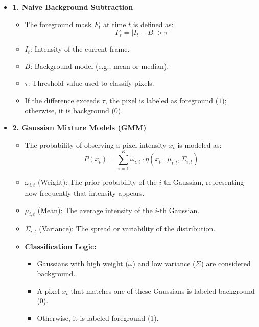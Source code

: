 \documentclass[12pt]{article}
\begin{document}
\begin{itemize}
    \item \textbf{1. Naive Background Subtraction}

          \begin{itemize}
              \item The foreground mask $F_t$ at time $t$ is defined as:
                    \[
                        F_t = |I_t - B| > \tau
                    \]

              \item $I_t$: Intensity of the current frame.

              \item $B$: Background model (e.g., mean or median).

              \item $\tau$: Threshold value used to classify pixels.

              \item If the difference exceeds $\tau$, the pixel is labeled as foreground ($1$); otherwise, it is background ($0$).
          \end{itemize}

    \item \textbf{2. Gaussian Mixture Models (GMM)}

          \begin{itemize}
              \item The probability of observing a pixel intensity $x_t$ is modeled as:
                    \[
                        P(x_t) = \sum_{i=1}^{K} \omega_{i,t} \cdot \eta(x_t \mid \mu_{i,t}, \Sigma_{i,t})
                    \]

              \item $\omega_{i,t}$ (Weight): The prior probability of the $i$-th Gaussian, representing how frequently that intensity appears.

              \item $\mu_{i,t}$ (Mean): The average intensity of the $i$-th Gaussian.

              \item $\Sigma_{i,t}$ (Variance): The spread or variability of the distribution.

              \item \textbf{Classification Logic:}
                    \begin{itemize}
                        \item Gaussians with high weight ($\omega$) and low variance ($\Sigma$) are considered background.
                        \item A pixel $x_t$ that matches one of these Gaussians is labeled background ($0$).
                        \item Otherwise, it is labeled foreground ($1$).
                    \end{itemize}
          \end{itemize}
\end{itemize}
\end{document}
